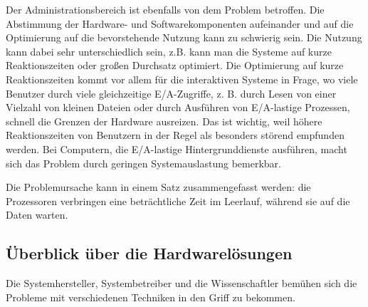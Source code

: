 Der Administrationsbereich ist ebenfalls von dem Problem betroffen. 
Die Abstimmung der Hardware- und Softwarekomponenten aufeinander und auf die Optimierung auf die bevorstehende Nutzung kann zu schwierig sein. 
Die Nutzung kann dabei sehr unterschiedlich sein, z.B. kann man die Systeme auf kurze Reaktionszeiten oder großen Durchsatz optimiert.
Die Optimierung auf kurze Reaktionszeiten kommt vor allem für die interaktiven Systeme in Frage, wo viele Benutzer durch viele gleichzeitige E/A-Zugriffe, z. B. durch Lesen von einer Vielzahl von kleinen Dateien oder durch Ausführen von E/A-lastige Prozessen, schnell die Grenzen der Hardware ausreizen. 
Das ist wichtig, weil höhere Reaktionszeiten von Benutzern in der Regel als besonders störend empfunden werden. 
Bei Computern, die E/A-lastige Hintergrunddienste ausführen, macht sich das Problem durch geringen Systemauslastung bemerkbar. 

Die Problemursache kann in einem Satz zusammengefasst werden: die Prozessoren verbringen eine beträchtliche Zeit im Leerlauf, während sie auf die Daten warten. 



\subsection{Überblick über die Hardwarelösungen}
Die Systemhersteller, Systembetreiber und die Wissenschaftler bemühen sich die Probleme mit verschiedenen Techniken in den Griff zu bekommen. 

